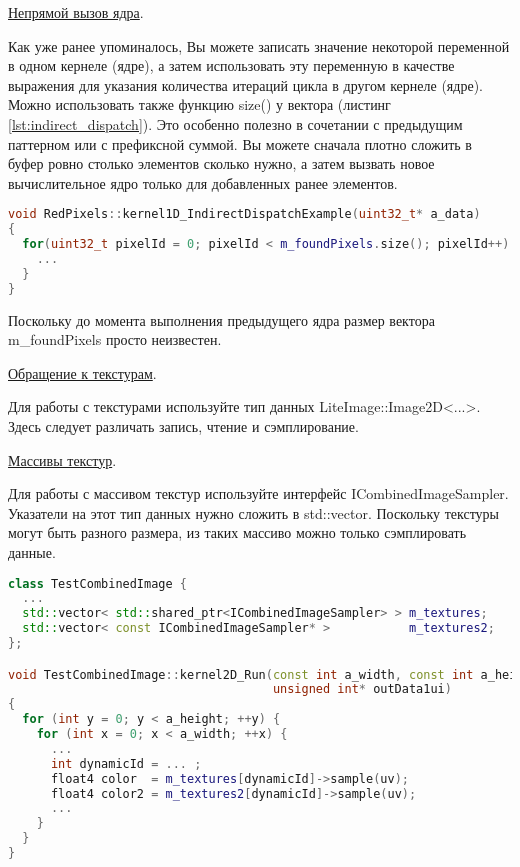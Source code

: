 \documentclass[11pt,fleqn,english,russian]{report} %
\begin{document}
\noindent\underline{Непрямой вызов ядра}.

Как уже ранее упоминалось, Вы можете записать значение некоторой переменной в одном кернеле (ядре), а затем использовать эту переменную в качестве выражения для указания количества итераций цикла в другом кернеле (ядре). Можно использовать также функцию size() у вектора (листинг \ref{lst:indirect_dispatch}). Это особенно полезно в сочетании с предыдущим паттерном или с префиксной суммой. Вы можете сначала плотно сложить в буфер ровно столько элементов сколько нужно, а затем вызвать новое вычислительное ядро только для добавленных ранее элементов.

\begin{lstlisting}[language=C++, 
	               caption=непрямой вызов ядра, 
	               label=lst:indirect_dispatch]	
void RedPixels::kernel1D_IndirectDispatchExample(uint32_t* a_data)
{
  for(uint32_t pixelId = 0; pixelId < m_foundPixels.size(); pixelId++) {
  	...
  }
}
\end{lstlisting}

Поскольку до момента выполнения предыдущего ядра размер вектора m\_foundPixels просто неизвестен.

\noindent\underline{Обращение к текстурам}.

Для работы с текстурами используйте тип данных LiteImage::Image2D<...>. Здесь следует различать запись, чтение и сэмплирование.

\noindent\underline{Массивы текстур}.

Для работы с массивом текстур используйте интерфейс ICombinedImageSampler.
Указатели на этот тип данных нужно сложить в std::vector. Поскольку текстуры могут быть разного размера, из таких массиво можно только сэмплировать данные.

\begin{lstlisting}[language=C++, 
	caption=сэмплирование из массива текстур, 
	label=lst:texarrays]	
class TestCombinedImage {
  ...  
  std::vector< std::shared_ptr<ICombinedImageSampler> > m_textures;
  std::vector< const ICombinedImageSampler* >           m_textures2;
};

void TestCombinedImage::kernel2D_Run(const int a_width, const int a_height, 
                                     unsigned int* outData1ui)
{
  for (int y = 0; y < a_height; ++y) {
    for (int x = 0; x < a_width; ++x) {  
      ...
      int dynamicId = ... ;			
      float4 color  = m_textures[dynamicId]->sample(uv); 
      float4 color2 = m_textures2[dynamicId]->sample(uv);     
      ...
    }
  }
}
\end{lstlisting}
\end{document}
